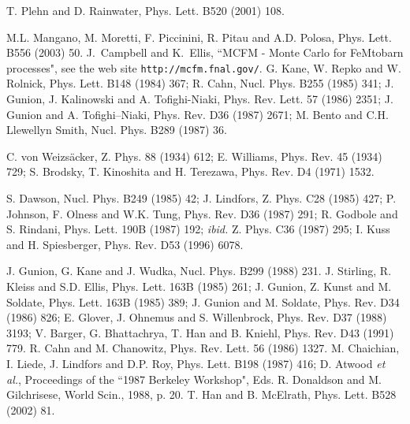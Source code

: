 \begin{thebibliography}{999}
 T. Plehn and D. Rainwater, Phys. Lett. B520 (2001) 108. 

 M.L. Mangano, M. Moretti, F. Piccinini, R. Pitau and A.D. 
Polosa,  Phys. Lett. B556 (2003) 50.
%
 J.~Campbell and K.~Ellis, ``MCFM - Monte Carlo for FeMtobarn 
processes", see the web site {\tt http://mcfm.fnal.gov/}. 
%
G. Kane, W. Repko and W. Rolnick, Phys. Lett. B148 (1984) 367;  
R. Cahn, Nucl. Phys. B255 (1985) 341; 
J. Gunion, J. Kalinowski and A. Tofighi-Niaki, Phys. Rev. Lett. 57 (1986) 2351; 
J. Gunion and A. Tofighi--Niaki, Phys. Rev. D36 (1987) 2671;
M. Bento and C.H. Llewellyn Smith, Nucl. Phys. B289 (1987) 36. 

 C. von Weizs\"acker, Z. Phys. 88 (1934) 612; 
E. Williams, Phys. Rev. 45 (1934) 729; 
S. Brodsky, T. Kinoshita and H. Terezawa, Phys. Rev. D4 (1971) 1532.

 S. Dawson, Nucl. Phys. B249 (1985) 42; 
J. Lindfors, Z. Phys. C28 (1985) 427; 
P. Johnson, F. Olness and W.K. Tung, Phys. Rev. D36 (1987) 291;
R. Godbole and S. Rindani, Phys. Lett. 190B (1987) 192; {\it ibid.} Z. Phys. 
C36 (1987) 295; I. Kuss and H. Spiesberger, Phys. Rev. D53 (1996) 6078. 

J. Gunion, G. Kane and J. Wudka, Nucl. Phys. B299 (1988) 231. 
J. Stirling, R. Kleiss and S.D. Ellis, Phys. Lett. 163B (1985) 261;
J. Gunion, Z. Kunst and M. Soldate, Phys. Lett. 163B (1985) 389; 
J. Gunion and M. Soldate, Phys. Rev. D34 (1986) 826; 
E. Glover, J. Ohnemus and S. Willenbrock, Phys. Rev. D37 (1988) 3193;
V. Barger, G. Bhattachrya, T. Han and B. Kniehl, Phys. Rev. D43 (1991) 779.   
%
 R. Cahn and M. Chanowitz, Phys. Rev. Lett. 56 
(1986) 1327. 
%
 M. Chaichian, I. Liede, J. Lindfors and D.P. Roy, 
Phys. Lett. B198 (1987) 416; D. Atwood {\it et al.}, Proceedings of the 
``1987 Berkeley Workshop", Eds. R. Donaldson and M. Gilchrisese, World Scin., 
1988, p. 20.   
%
 T. Han and  B. McElrath, Phys. Lett. B528 (2002) 81.  


\end{thebibliography}
